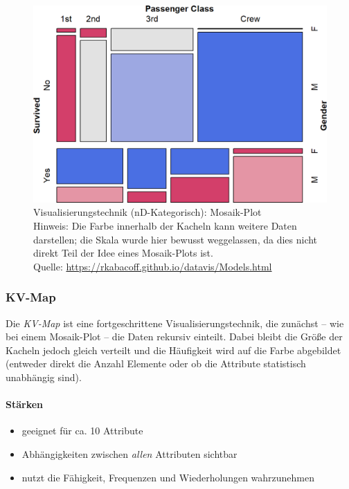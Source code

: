 				\begin{figure}
					\centering
					\includegraphics[width=0.8\linewidth]{mosaicplot}
					\caption[Visualisierungstechnik (nD-Kategorisch): Mosaik-Plot]{Visualisierungstechnik (nD-Kategorisch): Mosaik-Plot\\Hinweis: Die Farbe innerhalb der Kacheln kann weitere Daten darstellen; die Skala wurde hier bewusst weggelassen, da dies nicht direkt Teil der Idee eines Mosaik-Plots ist.\\Quelle: \url{https://rkabacoff.github.io/datavis/Models.html}}
					\label{fig:mosaicplot}
				\end{figure}

			\subsubsection{KV-Map}
				Die \emph{KV-Map} ist eine fortgeschrittene Visualisierungstechnik, die zunächst -- wie bei einem Mosaik-Plot -- die Daten rekursiv einteilt. Dabei bleibt die Größe der Kacheln jedoch gleich verteilt und die Häufigkeit wird auf die Farbe abgebildet (entweder direkt die Anzahl Elemente oder ob die Attribute statistisch unabhängig sind).

				\paragraph{Stärken}
				\begin{itemize}
					\item geeignet für ca. 10 Attribute
					\item Abhängigkeiten zwischen \emph{allen} Attributen sichtbar
					\item nutzt die Fähigkeit, Frequenzen und Wiederholungen wahrzunehmen
				\end{itemize}


